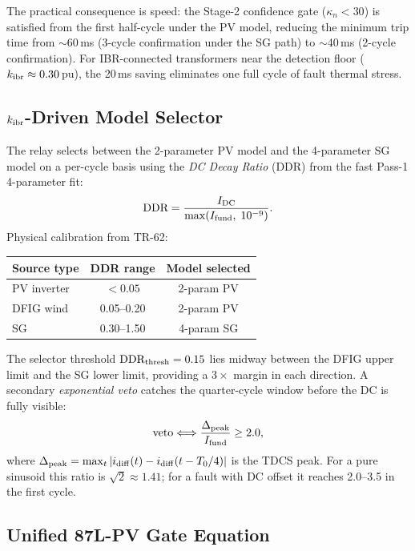 The practical consequence is speed: the Stage-2 confidence gate ($\kappa_n < 30$)
is satisfied from the first half-cycle under the PV model, reducing the minimum
trip time from $\sim$60\,ms (3-cycle confirmation under the SG path) to
$\sim$40\,ms (2-cycle confirmation).  For IBR-connected transformers near the
detection floor ($k_{\mathrm{ibr}} \approx 0.30$\,pu), the 20\,ms saving eliminates one
full cycle of fault thermal stress.

\subsection{$k_{\rm ibr}$-Driven Model Selector}
\label{sec:ch4_pv_selector}

The relay selects between the 2-parameter PV model and the 4-parameter SG model
on a per-cycle basis using the \emph{DC Decay Ratio} (DDR) from the fast Pass-1
4-parameter fit:
\begin{equation}
  \text{DDR} = \frac{I_{\rm DC}}{\max(I_{\rm fund},\; 10^{-9})}.
  \label{eq:ch4_ddr}
\end{equation}
Physical calibration from TR-62:
\begin{center}
\begin{tabular}{lcc}
  \toprule
  Source type & DDR range & Model selected \\
  \midrule
  PV inverter & $< 0.05$ & 2-param PV \\
  DFIG wind   & 0.05--0.20 & 2-param PV \\
  SG          & 0.30--1.50 & 4-param SG \\
  \bottomrule
\end{tabular}
\end{center}
The selector threshold $\text{DDR}_{\rm thresh} = 0.15$ lies midway between the
DFIG upper limit and the SG lower limit, providing a $3{\times}$ margin in each
direction.  A secondary \emph{exponential veto} catches the quarter-cycle window
before the DC is fully visible:
\begin{equation}
  \text{veto} \Longleftrightarrow
  \frac{\Delta_{\rm peak}}{I_{\rm fund}} \geq 2.0,
  \label{eq:ch4_pv_veto}
\end{equation}
where $\Delta_{\rm peak} = \max_t|i_{\rm diff}(t) - i_{\rm diff}(t-T_0/4)|$
is the TDCS peak.  For a pure sinusoid this ratio is $\sqrt{2} \approx 1.41$;
for a fault with DC offset it reaches 2.0--3.5 in the first cycle.

\subsection{Unified 87L-PV Gate Equation}
\label{sec:ch4_pv_gate}

